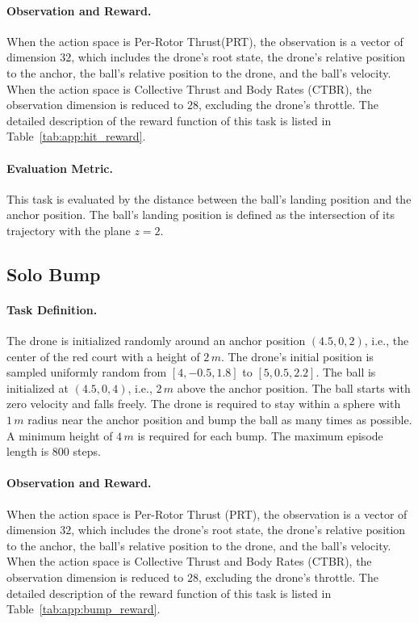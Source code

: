 \paragraph{Observation and Reward.}
When the action space is Per-Rotor Thrust(PRT), the observation is a vector of dimension $32$, which includes the drone's root state, the drone's relative position to the anchor, the ball's relative position to the drone, and the ball's velocity. When the action space is Collective Thrust and Body Rates (CTBR), the observation dimension is reduced to $28$, excluding the drone’s throttle. The detailed description of the reward function of this task is listed in Table~\ref{tab:app:hit_reward}.

\paragraph{Evaluation Metric.}
This task is evaluated by the distance between the ball's landing position and the anchor position. The ball’s landing position is defined as the intersection of its trajectory with the plane $z = 2$.


\subsection{Solo Bump}

\paragraph{Task Definition.}
The drone is initialized randomly around an anchor position $(4.5, 0, 2)$, i.e., the center of the red court with a height of $2\,m$. The drone's initial position is sampled uniformly random from $[4, -0.5, 1.8]$ to $[5, 0.5, 2.2]$. The ball is initialized at $(4.5, 0, 4)$, i.e., $2\,m$ above the anchor position. The ball starts with zero velocity and falls freely. The drone is required to stay within a sphere with $1\,m$ radius near the anchor position and bump the ball as many times as possible. A minimum height of $4\,m$ is required for each bump. The maximum episode length is $800$ steps.

\paragraph{Observation and Reward.}
When the action space is Per-Rotor Thrust (PRT), the observation is a vector of dimension $32$, which includes the drone's root state, the drone's relative position to the anchor, the ball's relative position to the drone, and the ball's velocity. When the action space is Collective Thrust and Body Rates (CTBR), the observation dimension is reduced to $28$, excluding the drone’s throttle. The detailed description of the reward function of this task is listed in Table~\ref{tab:app:bump_reward}.

